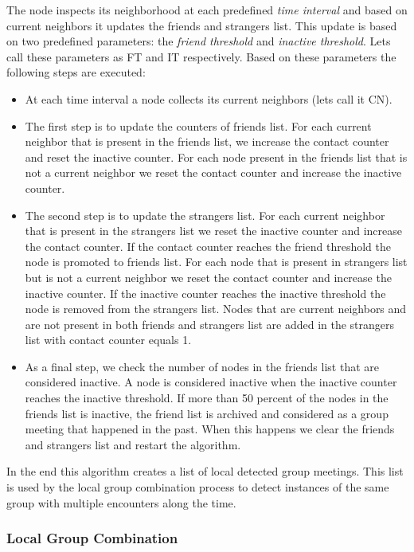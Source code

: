 The node inspects its neighborhood at each predefined \textit{time interval} and based on current neighbors
it updates the friends and strangers list. This update is based on two predefined parameters: the \textit{friend threshold}
and \textit{inactive threshold}. Lets call these parameters as FT and IT respectively. Based on these parameters the following 
steps are executed:

\begin{itemize}
	\item At each time interval a node collects its current neighbors (lets call it CN).
	\item The first step is to update the counters of friends list. For each current neighbor that is present in the friends
	list, we increase the contact counter and reset the inactive counter. For each node present in the friends list that is 
	not a current neighbor we reset the contact counter and increase the inactive counter.
	\item The second step is to update the strangers list. For each current neighbor that is present in the strangers list
	we reset the inactive counter and increase the contact counter. If the contact counter reaches the friend threshold
	the node is promoted to friends list. For each node that is present in strangers list but is not a current neighbor
	we reset the contact counter and increase the inactive counter. If the inactive counter reaches the inactive threshold
	the node is removed from the strangers list. Nodes that are current neighbors and are not present in both friends and strangers
	list are added in the strangers list with contact counter equals 1.
	\item As a final step, we check the number of nodes in the friends list that are considered inactive. A node is considered 
	inactive when the inactive counter reaches the inactive threshold. If more than 50 percent of the nodes in the friends list
	is inactive, the friend list is archived and considered as a group meeting that happened in the past. When this happens we
	clear the friends and strangers list and restart the algorithm. 
\end{itemize}

In the end this algorithm creates a list of local detected group meetings. This list is used by the local group combination process to
detect instances of the same group with multiple encounters along the time.

\subsubsection{Local Group Combination}


